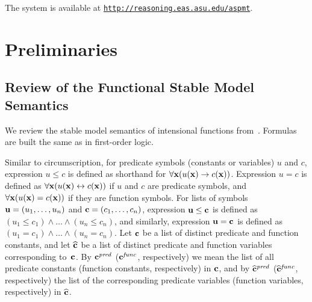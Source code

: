 \documentclass[runningheads]{llncs}
\def\rar{\rightarrow}
\def\lrar{\leftrightarrow}
\def\mi#1{\mathit{#1}}
\def\bC{{\bf{c}}}
\def\vbC{{\wh{\bf{c}}}}
\def\wh{\widehat}
\begin{document}

The system is available at {\tt \url{http://reasoning.eas.asu.edu/aspmt}}.


\section{Preliminaries}\label{sec:prelim}

\subsection{Review of the Functional Stable Model Semantics}

We review the stable model semantics of intensional functions
from~\cite{bartholomew12stable}.
Formulas are built the same as in first-order logic.

Similar to circumscription, for predicate symbols (constants or
variables) $u$ and $c$, expression $u\le c$ is defined as shorthand for
\hbox{$\forall {\bf x}(u({\bf x})\rar c({\bf x}))$}.
Expression $u=c$ is defined as
\hbox{$\forall {\bf x}(u({\bf x})\lrar c({\bf x}))$}
if $u$ and $c$ are predicate symbols, and
$\forall {\bf x}(u({\bf x})=c({\bf x}))$
if they are function symbols.
For lists of symbols ${\bf u}=(u_1,\dots,u_n)$ and
${\bf c}=(c_1,\dots,c_n)$, expression ${\bf u}\le {\bf c}$ is defined
as $(u_1\le c_1)\land\dots\land (u_n\le c_n)$, 
and similarly, expression ${\bf u} = {\bf c}$ is defined
as $(u_1 = c_1)\land\dots\land (u_n = c_n)$.
Let $\bC$ be a list of distinct predicate and function constants, and
let $\vbC$ be a list of distinct predicate and function variables
corresponding to~$\bC$. 
By $\bC^\mi{pred}$ ($\bC^\mi{func}$, respectively) we mean the
list of all predicate constants (function constants, respectively) in
$\bC$, and by $\vbC^\mi{pred}$ ($\vbC^\mi{func}$, respectively) the
list of the corresponding predicate variables (function
  variables, respectively) in $\vbC$.
\end{document}
